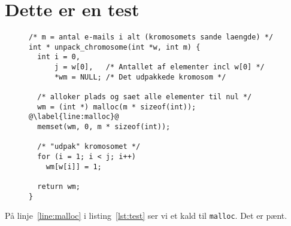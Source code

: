 \documentclass[testmain.tex]{subfiles}
\begin{document}
\chapter{Dette er en test}

\begin{figure}
\begin{lstlisting}[style=mycodestyle, caption={Udpakning af kromosomet}, label=lst:test]
/* m = antal e-mails i alt (kromosomets sande laengde) */
int * unpack_chromosome(int *w, int m) {
  int i = 0,
      j = w[0],   /* Antallet af elementer incl w[0] */
      *wm = NULL; /* Det udpakkede kromosom */
      
  /* alloker plads og saet alle elementer til nul */
  wm = (int *) malloc(m * sizeof(int)); @\label{line:malloc}@
  memset(wm, 0, m * sizeof(int));
  
  /* "udpak" kromosomet */
  for (i = 1; i < j; i++)
    wm[w[i]] = 1;

  return wm;
}
\end{lstlisting}
\end{figure}

På linje~\ref{line:malloc} i listing~\ref{lst:test} ser vi et kald til \texttt{malloc}.
Det er pænt.
\end{document}
